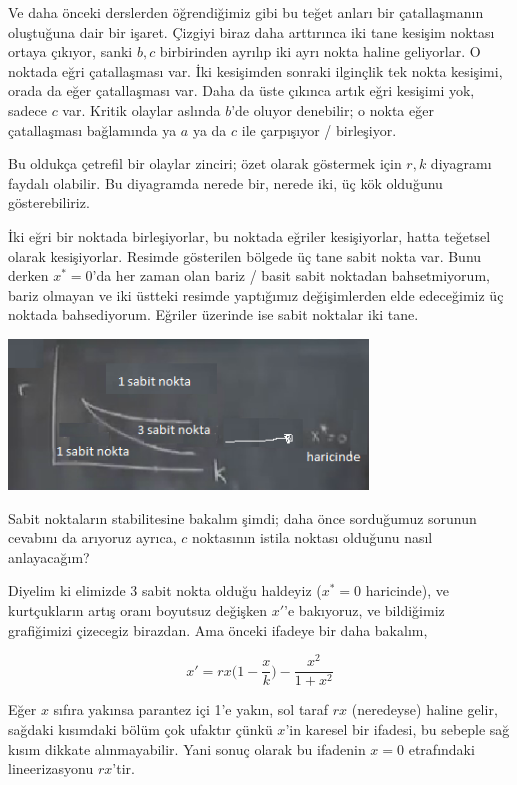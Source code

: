 \documentclass[12pt,fleqn]{article}\usepackage{../../common}
\begin{document}
Ve daha önceki derslerden öğrendiğimiz gibi bu teğet anları bir çatallaşmanın
oluştuğuna dair bir işaret. Çizgiyi biraz daha arttırınca iki tane kesişim
noktası ortaya çıkıyor, sanki $b,c$ birbirinden ayrılıp iki ayrı nokta haline
geliyorlar. O noktada eğri çatallaşması var. İki kesişimden sonraki ilginçlik
tek nokta kesişimi, orada da eğer çatallaşması var. Daha da üste çıkınca artık
eğri kesişimi yok, sadece $c$ var. Kritik olaylar aslında $b$'de oluyor
denebilir; o nokta eğer çatallaşması bağlamında ya $a$ ya da $c$ ile çarpışıyor
/ birleşiyor.

Bu oldukça çetrefil bir olaylar zinciri; özet olarak göstermek için $r,k$
diyagramı faydalı olabilir. Bu diyagramda nerede bir, nerede iki, üç kök
olduğunu gösterebiliriz. 

İki eğri bir noktada birleşiyorlar, bu noktada eğriler kesişiyorlar, hatta
teğetsel olarak kesişiyorlar. Resimde gösterilen bölgede üç tane sabit nokta
var. Bunu derken $x^*=0$'da her zaman olan bariz / basit sabit noktadan
bahsetmiyorum, bariz olmayan ve iki üstteki resimde yaptığımız değişimlerden
elde edeceğimiz üç noktada bahsediyorum. Eğriler üzerinde ise sabit noktalar iki
tane.

\includegraphics[height=4cm]{04_08.png}

Sabit noktaların stabilitesine bakalım şimdi; daha önce sorduğumuz sorunun
cevabını da arıyoruz ayrıca, $c$ noktasının istila noktası olduğunu nasıl
anlayacağım? 

Diyelim ki elimizde 3 sabit nokta olduğu haldeyiz ($x^*=0$ haricinde), ve
kurtçukların artış oranı boyutsuz değişken $x'$'e bakıyoruz, ve bildiğimiz
grafiğimizi çizecegiz birazdan. Ama önceki ifadeye bir daha bakalım,

$$ x' = rx \bigg( 1 - \frac{x}{k}\bigg) - \frac{x^2}{1+x^2} $$

Eğer $x$ sıfıra yakınsa parantez içi 1'e yakın, sol taraf $rx$ (neredeyse)
haline gelir, sağdaki kısımdaki bölüm çok ufaktır çünkü $x$'in karesel bir
ifadesi, bu sebeple sağ kısım dikkate alınmayabilir. Yani sonuç olarak bu
ifadenin $x=0$ etrafındaki lineerizasyonu $rx$'tir.
\end{document}
